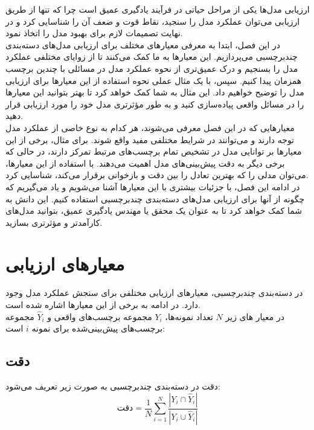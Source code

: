 
ارزیابی مدل‌ها یکی از مراحل حیاتی در فرآیند یادگیری عمیق است چرا که تنها از طریق ارزیابی می‌توان عملکرد مدل را سنجید، نقاط قوت و ضعف آن را شناسایی کرد و در نهایت تصمیمات لازم برای بهبود مدل را اتخاذ نمود.
\\
در این فصل، ابتدا به معرفی معیارهای مختلف برای ارزیابی مدل‌های دسته‌بندی چندبرچسبی می‌پردازیم. این معیارها به ما کمک می‌کنند تا از زوایای مختلفی عملکرد مدل را بسنجیم و درک عمیق‌تری از نحوه عملکرد مدل در مسائلی با چندین برچسب همزمان پیدا کنیم. سپس، با یک مثال عملی نحوه استفاده از این معیارها برای ارزیابی مدل را توضیح خواهیم داد. این مثال به شما کمک خواهد کرد تا بهتر بتوانید این معیارها را در مسائل واقعی پیاده‌سازی کنید و به طور مؤثرتری مدل خود را مورد ارزیابی قرار دهید.
\\
معیارهایی که در این فصل معرفی می‌شوند، هر کدام به نوع خاصی از عملکرد مدل توجه دارند و می‌توانند در شرایط مختلفی مفید واقع شوند. برای مثال، برخی از این معیارها بر توانایی مدل در تشخیص تمام برچسب‌های مرتبط تمرکز دارند، در حالی که برخی دیگر به دقت پیش‌بینی‌های مدل اهمیت می‌دهند. با استفاده از این معیارها، می‌توان مدلی را که بهترین تعادل را بین دقت و بازخوانی برقرار می‌کند، شناسایی کرد.
\\
در ادامه این فصل، با جزئیات بیشتری با این معیارها آشنا می‌شویم و یاد می‌گیریم که چگونه از آنها برای ارزیابی مدل‌های دسته‌بندی چندبرچسبی استفاده کنیم. این دانش به شما کمک خواهد کرد تا به عنوان یک محقق یا مهندس یادگیری عمیق، بتوانید مدل‌های کارآمدتر و مؤثرتری بسازید.
\section{معیارهای ارزیابی}

در دسته‌بندی چندبرچسبی، معیارهای ارزیابی مختلفی برای سنجش عملکرد مدل وجود دارد. در ادامه به برخی از این معیارها اشاره شده است.
\\
در معیار های زیر $N$ تعداد نمونه‌ها، $Y_i$ مجموعه برچسب‌های واقعی و $\hat{Y}_i$ مجموعه برچسب‌های پیش‌بینی‌شده برای نمونه $i$ است:


\subsection{دقت \protect{}}

دقت در دسته‌بندی چندبرچسبی به صورت زیر تعریف می‌شود:
\cite{evaluationMetric}
\begin{equation}
	\text{دقت} = \frac{1}{N} \sum_{i=1}^{N} \frac{|Y_i \cap \hat{Y}_i|}{|Y_i \cup \hat{Y}_i|}
	\label{eq:accuracy}
\end{equation}
